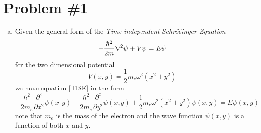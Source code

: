 \documentclass[11pt]{article}
\numberwithin{equation}{section}
\begin{document}


\section{Problem \#1}
\begin{enumerate}[(a)]
\item
Given the general form of the \emph{Time-independent Schr\"{o}dinger Equation}
\begin{equation}
-\frac{\hbar^2}{2m}\bold\nabla^2\psi + V\psi = E\psi
\label{TISE}
\end{equation}
for the two dimensional potential 
$$V(x,y) = \frac{1}{2}m_e\omega^2\left(x^2+y^2\right)$$
we have equation \ref{TISE} in the form
$$-\frac{\hbar^2}{2m_e}\frac{\partial^2}{\partial x^2}\psi(x,y) - \frac{\hbar^2}{2m_e}\frac{\partial^2}{\partial y^2}\psi(x,y) + \frac{1}{2}m_e\omega^2\left(x^2+y^2\right)\psi(x,y) = E\psi(x,y)$$
note that $m_e$ is the mass of the electron and the wave function $\psi(x,y)$ is a function of both $x$ and $y$.


\end{enumerate}
\end{document}
